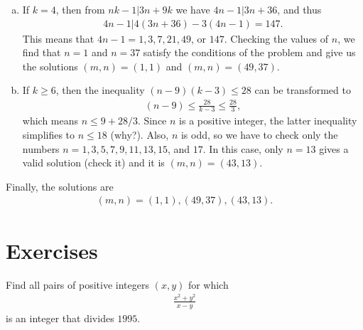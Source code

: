 \documentclass{subfile}
\begin{document}
\begin{solution}
\begin{enumerate}[(a)]
				\item If $k=4$, then from $nk-1|3n+9k$ we have $4n-1|3n+36$, and thus
					\begin{align*}
						4n-1|4(3n+36)-3(4n-1)=147.
					\end{align*}
				This means that $4n-1=1, 3, 7, 21, 49$, or $147$. Checking the values of $n$, we find that $n=1$ and $n=37$ satisfy the conditions of the problem and give us the solutions $(m,n)=(1,1)$ and $(m,n)=(49,37)$.

				\item If $k\geq 6$, then the inequality $(n-9)(k-3) \leq 28$ can be transformed to
					\begin{align*}
						(n-9) \leq \frac{28}{k-3} \leq \frac{28}{3},
					\end{align*}
				which means $n\leq 9+28/3$. Since $n$ is a positive integer, the latter inequality simplifies to $n \leq 18$ (why?). Also, $n$ is odd, so we have to check only the numbers $n=1, 3, 5, 7, 9, 11, 13, 15$, and $17$. In this case, only $n=13$ gives a valid solution (check it) and it is $(m,n)=(43,13)$.
			\end{enumerate}
		Finally, the solutions are
			\begin{align*}
				(m,n)=(1,1), (49,37), (43,13).
			\end{align*}
	\end{solution}
\newpage
\section{Exercises}


	\begin{problem}
		Find all pairs of positive integers $(x, y)$ for which
			\begin{align*}
				\frac{x^2+y^2}{x-y}
			\end{align*}
		is an integer that divides $1995$.
	\end{problem}

%
\end{document}
